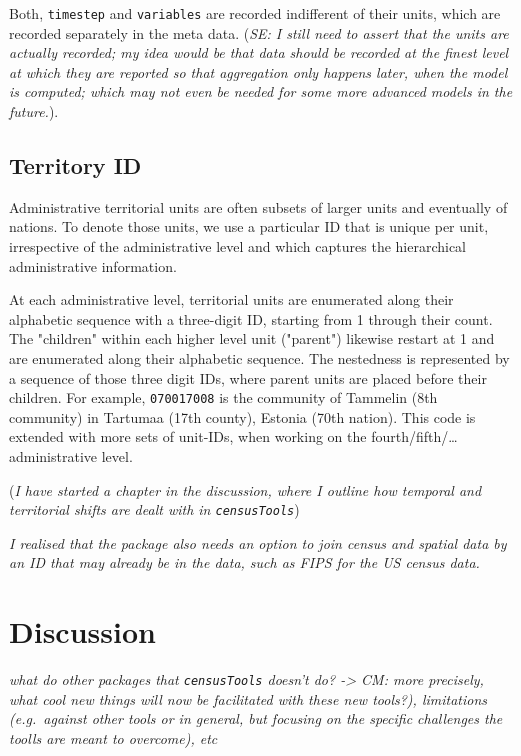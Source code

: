 \documentclass[12pt,]{article}
\begin{document}
Both, \texttt{timestep} and \texttt{variables} are recorded indifferent of their units, which are recorded separately in the meta data. (\emph{SE: I still need to assert that the units are actually recorded; my idea would be that data should be recorded at the finest level at which they are reported so that aggregation only happens later, when the model is computed; which may not even be needed for some more advanced models in the future.}).

\hypertarget{territory-id}{%
\subsection{Territory ID}\label{territory-id}}

Administrative territorial units are often subsets of larger units and eventually of nations.
To denote those units, we use a particular ID that is unique per unit, irrespective of the administrative level and which captures the hierarchical administrative information.

At each administrative level, territorial units are enumerated along their alphabetic sequence with a three-digit ID, starting from 1 through their count. The "children" within each higher level unit ("parent") likewise restart at 1 and are enumerated along their alphabetic sequence.
The nestedness is represented by a sequence of those three digit IDs, where parent units are placed before their children. For example, \texttt{070\textquotesingle{}017\textquotesingle{}008} is the community of Tammelin (8th community) in Tartumaa (17th county), Estonia (70th nation).
This code is extended with more sets of unit-IDs, when working on the fourth/fifth/\ldots{} administrative level.

(\emph{I have started a chapter in the discussion, where I outline how temporal and territorial shifts are dealt with in \texttt{censusTools}})

\emph{I realised that the package also needs an option to join census and spatial data by an ID that may already be in the data, such as FIPS for the US census data.}

\hypertarget{discussion}{%
\section{Discussion}\label{discussion}}

\emph{what do other packages that \texttt{censusTools} doesn't do? -\textgreater{} CM: more precisely, what cool new things will now be facilitated with these new tools?), limitations (e.g.~against other tools or in general, but focusing on the specific challenges the toolls are meant to overcome), etc}
\end{document}
